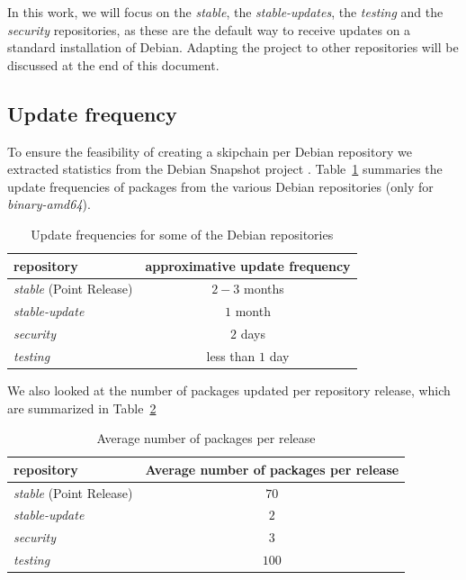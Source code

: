 \documentclass[11pt, upma4paper, twoside, openany, parskip=half]{book}
\begin{document}
In this work, we will focus on the \emph{stable}, the \emph{stable-updates}, the \emph{testing} and the \emph{security} repositories, as these are the default way to receive updates on a standard installation of Debian. Adapting the project to other repositories will be discussed at the end of this document.

\subsection{Update frequency}

To ensure the feasibility of creating a skipchain per Debian repository we extracted statistics from the Debian Snapshot project \cite{_debian_????}. Table~\ref{repo_update_freq} summaries the update frequencies of packages from the various Debian repositories (only for \emph{binary-amd64}).

\begin{table}[h]
\centering
\begin{tabular}{ | l | c | }
\hline
repository & approximative update frequency \\
\hline
\emph{stable} (Point Release) & $2-3$ months \\
\emph{stable-update} & $1$ month \\
\emph{security} & $2$ days \\
\emph{testing} & less than $1$ day \\
\hline
\end{tabular}
\caption{Update frequencies for some of the Debian repositories}
\label{repo_update_freq}
\end{table}

We also looked at the number of packages updated per repository release, which are summarized in Table~\ref{repo_update_num_of_packages}
	
\begin{table}[h]
	\centering
	\begin{tabular}{ | l | c | }
		\hline
		repository & Average number of packages per release \\
		\hline
		\emph{stable} (Point Release) & $70$ \\
		\emph{stable-update} & $2$ \\
		\emph{security} & $3$ \\
		\emph{testing} & $100$ \\
		\hline
	\end{tabular}
	\caption{Average number of packages per release}
	\label{repo_update_num_of_packages}
\end{table}
\end{document}
